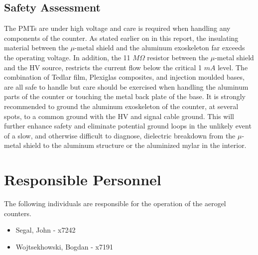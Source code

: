 \begin{safetyen}{10}{10}
\section{Safety Assessment}

The PMTs are under high voltage and care is required when handling any 
components of the counter. As stated earlier on in this report, the insulating 
material between the $\mu$-metal shield and the aluminum exoskeleton far 
exceeds the operating voltage. In addition, the 11 $M\Omega$ resistor between 
the $\mu$-metal shield and the HV source, restricts the current flow below the  
critical 1 $mA$ level. The combination of Tedlar film, Plexiglas composites, 
and injection moulded bases, are all safe to handle but care should be 
exercised when handling the aluminum parts of the counter or touching the metal 
back plate of the base. It is strongly recommended to ground the aluminum 
exoskeleton of the counter, at several spots, to a common ground with the HV 
and signal cable ground. This will further enhance safety and eliminate 
potential ground loops in the unlikely event of a slow, and otherwise difficult 
to diagnose, dielectric breakdown from the $\mu$-metal shield to the aluminum 
structure or the aluminized mylar in the interior.  

\end{safetyen}

\section{Responsible Personnel} 
The following individuals are responsible for the operation 
of the aerogel \Cherenkov{} counters.
 
\begin{itemize}
\item[~]Segal, John - x7242 
\item[~]Wojtsekhowski, Bogdan - x7191 
\end{itemize} 

%
%

